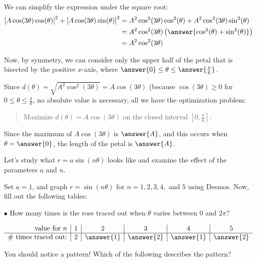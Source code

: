 \documentclass{ximera}
\begin{document}
\begin{exercise}
\begin{exercise}
\begin{exercise}
\begin{exercise}
We can simplify the expression under the square root:
\begin{align*}
\left[A\cos(3\theta)\cos(\theta)\right]^2+\left[A\cos(3\theta)\sin(\theta) \right]^2 &= A^2\cos^2(3\theta) \cos^2(\theta) + A^2\cos^2(3\theta) \sin^2(\theta)\\
&=  A^2\cos^2(3\theta) \left( \answer{\cos^2(\theta)+\sin^2(\theta)} \right) \\
&= A^2\cos^2(3\theta)
\end{align*}

Now, by symmetry, we can consider only the upper half of the petal that is bisected by the positive $x$-axis, where $\answer{0} \leq \theta \leq \answer{\frac{\pi}{6}}$.

Since $d(\theta) =\sqrt{A^2\cos^2(3\theta)} = A\cos(3\theta)$ (because $\cos(3\theta)\geq 0$ for $0 \leq \theta \leq \frac{\pi}{6}$, no absolute value is necessary, all we have the optimization problem:

\begin{quote}
Maximize $d(\theta) = A\cos(3\theta)$ on the closed interval $\left[0,\frac{\pi}{6}\right]$.
\end{quote}

Since the maximum of $A\cos(3\theta)$ is $\answer{A}$, and this occurs when $\theta = \answer{0}$, the length of the petal is $\answer{A}$.
\end{exercise}
\end{exercise}
\end{exercise}
\begin{exercise}
Let's study what $r= a \sin(n \theta)$ looks like and examine the effect of the parameters $a$ and $n$.  

Set $a=1$, and graph $r=\sin(n \theta)$ for $n=1,2,3,4,$ and $5$ using Desmos.  Now, fill out the following tables:

$\bullet$ How many times is the rose traced out when $\theta$ varies between $0$ and $2 \pi$?

\[
\begin{array}{r|c|c|c|c|c}
\textrm{value for } n & 1 & 2 & 3 & 4 & 5 \\
\hline
\textrm{\# times traced out:} & 2 & \answer{1} & \answer{2} & \answer{1} & \answer{2}
\end{array}
\]

\begin{exercise}
You should notice a pattern! Which of the following describes the pattern?
\begin{multipleChoice}
\end{multipleChoice}
\end{exercise}


\end{exercise}
\end{exercise}
\end{document}
